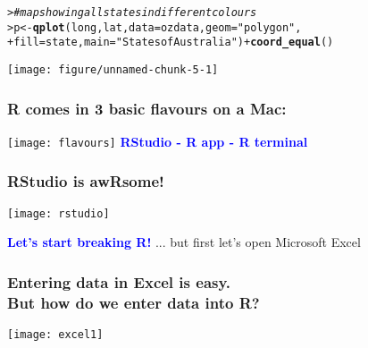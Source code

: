 \documentclass[13pt,aspectratio=169]{beamer}\usepackage[]{graphicx}\usepackage[]{color}
\makeatletter
\def\maxwidth{ %
  \ifdim\Gin@nat@width>\linewidth
    \linewidth
  \else
    \Gin@nat@width
  \fi
}
\newcommand{\hlstr}[1]{\textcolor[rgb]{0.192,0.494,0.8}{#1}}%
\newcommand{\hlcom}[1]{\textcolor[rgb]{0.678,0.584,0.686}{\textit{#1}}}%
\newcommand{\hlopt}[1]{\textcolor[rgb]{0,0,0}{#1}}%
\newcommand{\hlstd}[1]{\textcolor[rgb]{0.345,0.345,0.345}{#1}}%
\newcommand{\hlkwb}[1]{\textcolor[rgb]{0.69,0.353,0.396}{#1}}%
\newcommand{\hlkwc}[1]{\textcolor[rgb]{0.333,0.667,0.333}{#1}}%
\newcommand{\hlkwd}[1]{\textcolor[rgb]{0.737,0.353,0.396}{\textbf{#1}}}%
\newenvironment{kframe}{%
 \def\at@end@of@kframe{}%
 \ifinner\ifhmode%
  \def\at@end@of@kframe{\end{minipage}}%
  \begin{minipage}{\columnwidth}%
 \fi\fi%
 \def\FrameCommand##1{\hskip\@totalleftmargin \hskip-\fboxsep
 \colorbox{shadecolor}{##1}\hskip-\fboxsep
     \hskip-\linewidth \hskip-\@totalleftmargin \hskip\columnwidth}%
 \MakeFramed {\advance\hsize-\width
   \@totalleftmargin\z@ \linewidth\hsize
   \@setminipage}}%
 {\par\unskip\endMakeFramed%
 \at@end@of@kframe}
\newenvironment{knitrout}{}{} %
\newcommand{\tc}[2]{\textcolor{#1}{#2}}
\renewenvironment{knitrout}{\setlength{\topsep}{0mm}}{}
\makeatother
\begin{document}
\begin{frame}[fragile]
\begin{knitrout}\small
{}\color{fgcolor}\begin{kframe}
\begin{alltt}
\hlstd{> }\hlcom{# map showing all states in different colours}
\hlstd{> }\hlstd{p} \hlkwb{<-} \hlkwd{qplot}\hlstd{(long, lat,} \hlkwc{data} \hlstd{= ozdata,} \hlkwc{geom} \hlstd{=} \hlstr{"polygon"}\hlstd{,}
\hlstd{+ }      \hlkwc{fill} \hlstd{= state,} \hlkwc{main} \hlstd{=} \hlstr{"States of Australia"}\hlstd{)} \hlopt{+} \hlkwd{coord_equal}\hlstd{()}
\end{alltt}
\end{kframe}
\end{knitrout}
\end{frame}

\begin{frame}[fragile]
\begin{knitrout}\small
{}\color{fgcolor}
\texttt{[image: figure/unnamed-chunk-5-1]} 

\end{knitrout}
\end{frame}

\begin{frame}
    \frametitle{R comes in 3 basic flavours on a Mac:}
    \texttt{[image: flavours]}
	    \vskip10pt
    \textbf{\LARGE{\tc{Blue}{RStudio - R app - R terminal}}}
\end{frame}

\begin{frame}
    \frametitle{RStudio is awRsome!}
    \begin{center}
	\texttt{[image: rstudio]}
    \end{center}
\end{frame}

\begin{frame}
    \begin{center}
	\tc{Blue}{\textbf{\Huge{Let's start breaking R!}}}
		\vskip10pt
	\LARGE{... but first let's open Microsoft Excel}
    \end{center}
\end{frame}

\begin{frame}
    \begin{center}
	\frametitle{Entering data in Excel is easy.
	    \\But how do we enter data into R?}
	\texttt{[image: excel1]}
    \end{center}
\end{frame}
\end{document}
